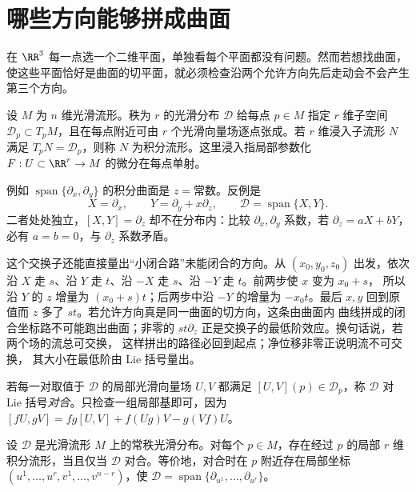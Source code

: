 \section{哪些方向能够拼成曲面}

在 \(\RR^3\) 每一点选一个二维平面，单独看每个平面都没有问题。然而若想找曲面，使这些平面恰好是曲面的切平面，就必须检查沿两个允许方向先后走动会不会产生第三个方向。

\begin{definition}[光滑分布与积分流形]
设 \(M\) 为 \(n\) 维光滑流形。秩为 \(r\) 的光滑分布 \(\mathcal D\) 给每点 \(p\in M\) 指定 \(r\) 维子空间 \(\mathcal D_p\subset T_pM\)，且在每点附近可由 \(r\) 个光滑向量场逐点张成。若 \(r\) 维浸入子流形 \(N\) 满足 \(T_pN=\mathcal D_p\)，则称 \(N\) 为积分流形。这里浸入指局部参数化 \(F:U\subset\RR^r\to M\) 的微分在每点单射。
\end{definition}

例如 \(\operatorname{span}\{\partial_x,\partial_y\}\) 的积分曲面是 \(z=\text{常数}\)。反例是
\[
X=\partial_x,\qquad Y=\partial_y+x\partial_z,\qquad
\mathcal D=\operatorname{span}\{X,Y\}.
\]
二者处处独立，\([X,Y]=\partial_z\) 却不在分布内：比较 \(\partial_x,\partial_y\) 系数，若 \(\partial_z=aX+bY\)，必有 \(a=b=0\)，与 \(\partial_z\) 系数矛盾。

这个交换子还能直接量出“小闭合路”未能闭合的方向。从
\((x_0,y_0,z_0)\) 出发，依次沿 \(X\) 走 \(s\)、沿 \(Y\) 走 \(t\)、沿
\(-X\) 走 \(s\)、沿 \(-Y\) 走 \(t\)。前两步使 \(x\) 变为 \(x_0+s\)，
所以沿 \(Y\) 的 \(z\) 增量为 \((x_0+s)t\)；后两步中沿
\(-Y\) 的增量为 \(-x_0t\)。最后 \(x,y\) 回到原值而
\(z\) 多了 \(st\)。若允许方向真是同一曲面的切方向，这条由曲面内
曲线拼成的闭合坐标路不可能跑出曲面；非零的 \(st\partial_z\)
正是交换子的最低阶效应。换句话说，若两个场的流总可交换，
这样拼出的路径必回到起点；净位移非零正说明流不可交换，
其大小在最低阶由 Lie 括号量出。

\begin{definition}[对合分布]
若每一对取值于 \(\mathcal D\) 的局部光滑向量场 \(U,V\) 都满足 \([U,V](p)\in\mathcal D_p\)，称 \(\mathcal D\) 对 Lie 括号\emph{对合}。只检查一组局部基即可，因为
\([fU,gV]=fg[U,V]+f(Ug)V-g(Vf)U\)。
\end{definition}

\begin{theorem}
设 \(\mathcal D\) 是光滑流形 \(M\) 上的常秩光滑分布。对每个 \(p\in M\)，存在经过 \(p\) 的局部 \(r\) 维积分流形，当且仅当 \(\mathcal D\) 对合。等价地，对合时在 \(p\) 附近存在局部坐标 \((u^1,\ldots,u^r,v^1,\ldots,v^{n-r})\)，使
\(\mathcal D=\operatorname{span}\{\partial_{u^1},\ldots,\partial_{u^r}\}\)。
\end{theorem}

